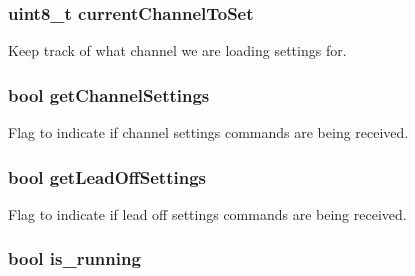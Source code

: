 \subsubsection[{current\+Channel\+To\+Set}]{\setlength{\rightskip}{0pt plus 5cm}uint8\+\_\+t current\+Channel\+To\+Set}\label{group___devices___library_ga15bd8e07189205b21eb37b666895ee0e}


Keep track of what channel we are loading settings for. 

\hypertarget{group___devices___library_ga7ef266ee79910e6754e8783b550b4a0a}{}
\subsubsection[{get\+Channel\+Settings}]{\setlength{\rightskip}{0pt plus 5cm}bool get\+Channel\+Settings}\label{group___devices___library_ga7ef266ee79910e6754e8783b550b4a0a}


Flag to indicate if channel settings commands are being received. 

\hypertarget{group___devices___library_ga774931d6c0caa199a9884bce2b300439}{}
\subsubsection[{get\+Lead\+Off\+Settings}]{\setlength{\rightskip}{0pt plus 5cm}bool get\+Lead\+Off\+Settings}\label{group___devices___library_ga774931d6c0caa199a9884bce2b300439}


Flag to indicate if lead off settings commands are being received. 

\hypertarget{group___devices___library_ga95cbd6b99430748422cc048b4f29dc52}{}
\subsubsection[{is\+\_\+running}]{\setlength{\rightskip}{0pt plus 5cm}bool is\+\_\+running}\label{group___devices___library_ga95cbd6b99430748422cc048b4f29dc52}


